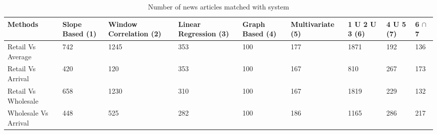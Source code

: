 \documentclass[a4paper,10pt]{report}
\begin{document}
    
    

  
	\begin{table}[]
	\centering
	
	\resizebox{\textwidth}{!}
	{\begin{tabular}{|l|l|l|l|l|l|l|l|l|}
	\hline
	Methods		    & Slope Based (1) & Window Correlation (2) & Linear Regression (3) & Graph Based (4) & Multivariate (5) & 1 U 2 U 3 (6) & 4 U 5 (7) & 6  $\cap$ 7 \\
	\hline
	Retail Vs Average    & 742             & 1245                   & 353                   & 100             & 177              & 1871          & 192       & 136       \\
	\hline
	Retail Vs Arrival    & 420             & 120                    & 353                   & 100             & 167              & 810           & 267       & 173       \\
	\hline
	Retail Vs Wholesale  & 658             & 1230                   & 310                   & 100             & 167              & 1819          & 229       & 132       \\
	\hline
	Wholesale Vs Arrival & 448             & 525                    & 282                   & 100             & 186              & 1165          & 286       & 217       \\
	\hline
	\end{tabular}}
	\caption{Number of news articles matched with system}
	\label{ArticlesMatched}
	\end{table}
	
      
\end{document}
